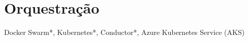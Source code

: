 


\section{Orquestração}

Docker Swarm*, Kubernetes*, Conductor*, Azure Kubernetes Service (AKS)







